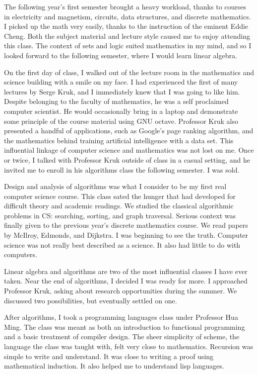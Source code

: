 \documentclass[12pt]{amsart}
\begin{document}
The following year's first semester brought a heavy workload, thanks to courses in electricity and magnetism, circuits, data structures, and discrete mathematics. I picked up the math very easily, thanks to the instruction of the eminent Eddie Cheng. Both the subject material and lecture style caused me to enjoy attending this class. The context of sets and logic suited mathematics in my mind, and so I looked forward to the following semester, where I would learn linear algebra.

On the first day of class, I walked out of the lecture room in the mathematics and science building with a smile on my face. I had experienced the first of many lectures by Serge Kruk, and I immediately knew that I was going to like him. Despite belonging to the faculty of mathematics, he was a self proclaimed computer scientist. He would occasionally bring in a laptop and demonstrate some principle of the course material using GNU octave. Professor Kruk also presented a handful of applications, such as Google's page ranking algorithm, and the mathematics behind training artificial intelligence with a data set. This influential linkage of computer science and mathematics was not lost on me. Once or twice, I talked with Professor Kruk outside of class in a casual setting, and he invited me to enroll in his algorithms class the following semester. I was sold.

Design and analysis of algorithms was what I consider to be my first real computer science course. This class sated the hunger that had developed for difficult theory and academic readings. We studied the classical algorithmic problems in CS: searching, sorting, and graph traversal. Serious context was finally given to the previous year's discrete mathematics course. We read papers by McIlroy, Edmonds, and Dijkstra. I was beginning to see the truth. Computer science was not really best described as a science. It also had little to do with computers. 

Linear algebra and algorithms are two of the most influential classes I have ever taken. Near the end of algorithms, I decided I was ready for more. I approached Professor Kruk, asking about research opportunities during the summer. We discussed two possibilities, but eventually settled on one.

After algorithms, I took a programming languages class under Professor Hua Ming. The class was meant as both an introduction to functional programming and a basic treatment of compiler design. The sheer simplicity of scheme, the language the class was taught with, felt very close to mathematics. Recursion was simple to write and understand. It was close to writing a proof using mathematical induction. It also helped me to understand lisp languages.
\end{document}

